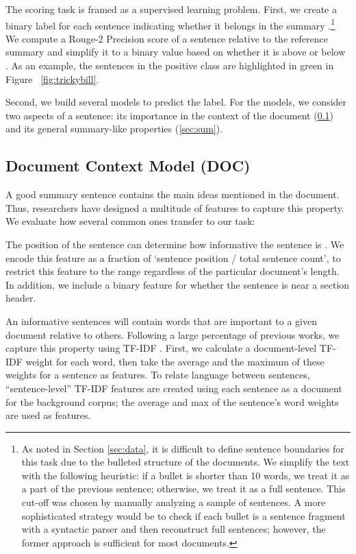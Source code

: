 \documentclass[11pt,a4paper]{article}
\begin{document}
The scoring task is framed as a supervised learning problem. First, we create a binary label for each sentence indicating whether it belongs in the summary \cite{gillick2008icsi}.\footnote{As noted in Section \ref{sec:data}, it is difficult to define sentence boundaries for this task due to the bulleted structure of the documents. We simplify the text with the following heuristic: if a bullet is shorter than 10 words, we treat it as a part of the previous sentence; otherwise, we treat it as a full sentence. This cut-off was chosen by manually analyzing a sample of sentences. A more sophisticated strategy would be to check if each bullet is a sentence fragment with a syntactic parser and then reconstruct full sentences; however, the former approach is sufficient for most documents.} 
We compute a Rouge-2 Precision score of a sentence relative to the reference summary and simplify it to a binary value based on whether it is above or below  \cite{lin2004rouge, zopfsentregression}. As an example, the sentences in the positive class are highlighted in green in Figure ~\ref{fig:trickybill}. 



Second, we build several models to predict the label. For the models, we consider two aspects of a sentence: its importance in the context of the document (\ref{sec:doc}) and its general summary-like properties (\ref{sec:sum}). 

\subsection{Document Context Model (DOC)}
\label{sec:doc}
A good summary sentence contains the main ideas mentioned in the document. Thus, researchers have designed a multitude of features to capture this property. We evaluate how several common ones transfer to our task:

The position of the sentence can determine how informative the sentence is \cite{seki2002tfidf}. 
We encode this feature as a fraction of `sentence position / total sentence count', to restrict this feature to the  range regardless of the particular document's length. In addition, we include a binary feature for whether the sentence is near a section header.

An informative sentences will contain words that are important to a given document relative to others. Following a large percentage of previous works, we capture this property using TF-IDF \cite{seki2002tfidf, ramos2003tfidf}. First, we calculate a document-level TF-IDF weight for each word, then take the average and the maximum of these weights for a sentence as features. To relate language between sentences, ``sentence-level'' TF-IDF features are created using each sentence as a document for the background corpus; the average and max of the sentence's word weights are used as features.
\end{document}
